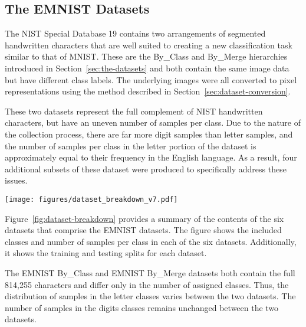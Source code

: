 \documentclass[conference]{IEEEtran}
\begin{document}
\subsection{The EMNIST Datasets}
\label{sec:dataset-characteristics}

The NIST Special Database 19 contains two arrangements of segmented handwritten characters that are well suited to creating a new classification task similar to that of MNIST. These are the By\_Class and By\_Merge hierarchies introduced in Section~\ref{sec:the-datasets} and both contain the same image data but have different class labels. The underlying images were all converted to  pixel representations using the method described in Section~\ref{sec:dataset-conversion}.

These two datasets represent the full complement of NIST handwritten characters, but have an uneven number of samples per class. Due to the nature of the collection process, there are far more digit samples than letter samples, and the number of samples per class in the letter portion of the dataset is approximately equal to their frequency in the English language. As a result, four additional subsets of these dataset were produced to specifically address these issues.

\begin{figure*}
  \centering
\texttt{[image: figures/dataset\_breakdown\_v7.pdf]}
  \caption{\textbf{Visual breakdown of the EMNIST datasets.} The class breakdown, structure and splits of the various datasets in the EMNIST dataset are shown. Each dataset contains handwritten digits, handwritten letters or a combination of both. The number of samples in each class is shown for each dataset and highlights the large variation in the number of samples in the unbalanced datasets. The training and testing split for each class is also shown using either solid or hatched portions of the bar graphs. In the datasets that contain merged classes, a vertical arrow is used to denote the class into which the lowercase letter is merged. }
  \label{fig:dataset-breakdown}
\end{figure*}

Figure~\ref{fig:dataset-breakdown} provides a summary of the contents of the six datasets that comprise the EMNIST datasets. The figure shows the included classes and number of samples per class in each of the six datasets. Additionally, it shows the training and testing splits for each dataset. 

The EMNIST By\_Class and EMNIST By\_Merge datasets both contain the full 814,255 characters and differ only in the number of assigned classes. Thus, the distribution of samples in the letter classes varies between the two datasets. The number of samples in the digits classes remains unchanged between the two datasets.
\end{document}
